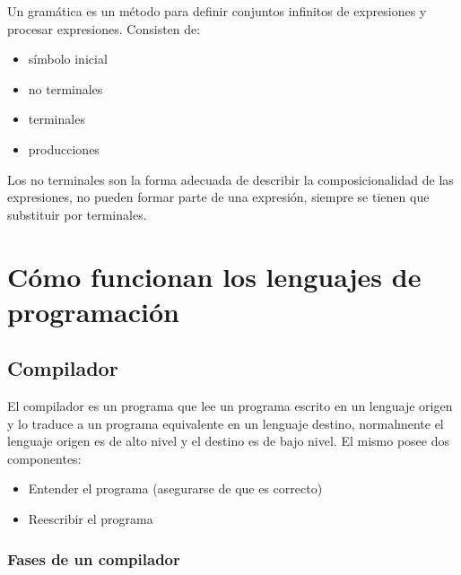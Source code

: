 \documentclass[10pt,a4paper]{report}
\begin{document}
\par Un gramática es un método para definir conjuntos infinitos de 
expresiones y procesar expresiones. Consisten de: 

	\begin{itemize}
		\item símbolo inicial
		\item no terminales
		\item terminales
		\item producciones
	\end{itemize}

\par Los no terminales son la forma adecuada de describir la 
composicionalidad de las expresiones, no pueden formar parte de una 
expresión, siempre se tienen que substituir por terminales.


\chapter{Cómo funcionan los lenguajes de programación}

\section{Compilador}
\par El compilador es un programa que lee un programa escrito en un 
lenguaje origen y lo traduce a un programa equivalente en un lenguaje destino, 
normalmente el lenguaje origen es de alto nivel y el destino es de bajo nivel. El 
mismo posee dos componentes:

	\begin{itemize}
		\item Entender el programa (asegurarse de que es correcto)
		\item Reescribir el programa
	\end{itemize}

\subsection{Fases de un compilador}
\end{document}
